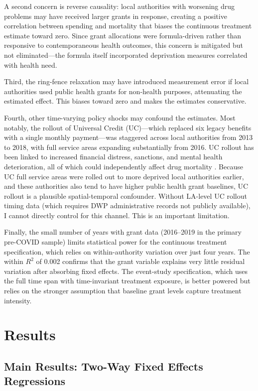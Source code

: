 \documentclass[12pt]{article}
\begin{document}
A second concern is reverse causality: local authorities with worsening drug problems may have received larger grants in response, creating a positive correlation between spending and mortality that biases the continuous treatment estimate toward zero. Since grant allocations were formula-driven rather than responsive to contemporaneous health outcomes, this concern is mitigated but not eliminated---the formula itself incorporated deprivation measures correlated with health need.

Third, the ring-fence relaxation may have introduced measurement error if local authorities used public health grants for non-health purposes, attenuating the estimated effect. This biases toward zero and makes the estimates conservative.

Fourth, other time-varying policy shocks may confound the estimates. Most notably, the rollout of Universal Credit (UC)---which replaced six legacy benefits with a single monthly payment---was staggered across local authorities from 2013 to 2018, with full service areas expanding substantially from 2016. UC rollout has been linked to increased financial distress, sanctions, and mental health deterioration, all of which could independently affect drug mortality \citep{reeves2014}. Because UC full service areas were rolled out to more deprived local authorities earlier, and these authorities also tend to have higher public health grant baselines, UC rollout is a plausible spatial-temporal confounder. Without LA-level UC rollout timing data (which requires DWP administrative records not publicly available), I cannot directly control for this channel. This is an important limitation.

Finally, the small number of years with grant data (2016--2019 in the primary pre-COVID sample) limits statistical power for the continuous treatment specification, which relies on within-authority variation over just four years. The within $R^2$ of 0.002 confirms that the grant variable explains very little residual variation after absorbing fixed effects. The event-study specification, which uses the full time span with time-invariant treatment exposure, is better powered but relies on the stronger assumption that baseline grant levels capture treatment intensity.


\section{Results}

\subsection{Main Results: Two-Way Fixed Effects Regressions}
\end{document}
